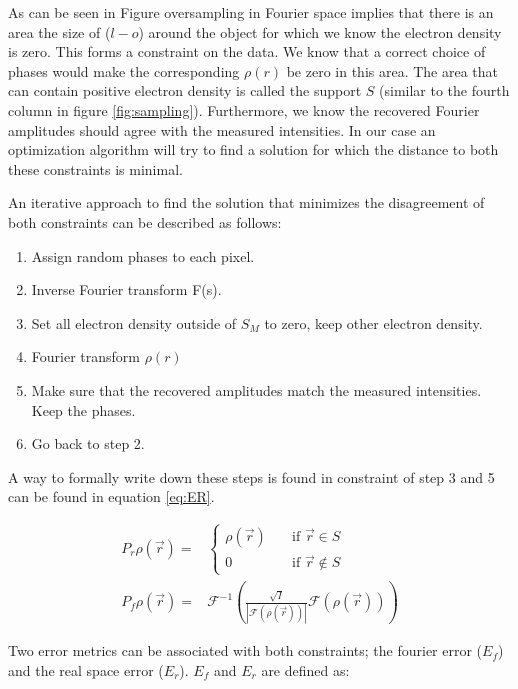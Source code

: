 As can be seen in Figure oversampling in Fourier space implies that there is an area the size of ($l-o$) around the object for which we know the electron density is zero. This forms a constraint on the data. We know that a correct choice of phases would make the corresponding $\rho(r)$ be zero in this area. The area that can contain positive electron density is called the support $S$ (similar to the fourth column in figure \ref{fig:sampling}). Furthermore, we know the recovered Fourier amplitudes should agree with the measured intensities. In our case an optimization algorithm will try to find a solution for which the distance to both these constraints is minimal. 

An iterative approach to find the solution that minimizes the disagreement of both constraints can be
described as follows:\\


\begin{enumerate}
\item Assign random phases to each pixel.
\item Inverse Fourier transform F(s).
\item Set all electron density outside of $S_M$ to zero, keep other electron density.
\item Fourier transform $\rho(r)$
\item Make sure that the recovered amplitudes match the measured intensities. Keep the phases.
\item Go back to step 2.
\end{enumerate}

A way to formally write down these steps is found in  constraint of step 3 and 5 can be found in equation \ref{eq:ER}.

\begin{align}\label{eq:ER}
P_r \rho\left(\vec{r}\right) =& \begin{cases} \rho\left(\vec{r}\right) \quad &\mathrm{if}\,\,
    \vec{r} \in S\\0 \quad & \mathrm{if}\,\, \vec{r} \not\in S \end{cases}\\
P_f \rho(\vec{r}) =& \mathcal{F}^{-1}\left( \frac{\sqrt{I}}{|\mathcal{F}(\rho(\vec{r}))|}\mathcal{F}(\rho(\vec{r})) \right)
\end{align}

Two error metrics can be associated with both constraints; the fourier error ($E_f$) and the real space error ($E_r$). $E_f$ and $E_r$ are defined as:

